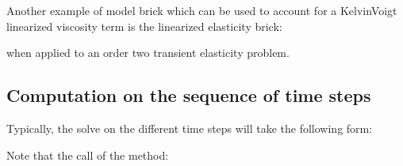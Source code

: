 \documentclass[a4paper,11pt,english]{sphinxmanual}
\begin{document}
Another example of model brick which can be used to account for a Kelvin\sphinxhyphen{}Voigt linearized viscosity term is the linearized elasticity brick:

\begin{sphinxVerbatim}[commandchars=\\\{\}]
    
\end{sphinxVerbatim}

when applied to an order two transient elasticity problem.


\subsection{Computation on the sequence of time steps}
\label{\detokenize{userdoc/model_time_integration:computation-on-the-sequence-of-time-steps}}
Typically, the solve on the different time steps will take the following form:

\begin{sphinxVerbatim}[commandchars=\\\{\}]
            


   


\end{sphinxVerbatim}

Note that the call of the method:

\begin{sphinxVerbatim}[commandchars=\\\{\}]
\end{sphinxVerbatim}
\end{document}
